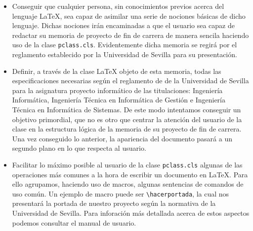 			\begin{itemize}
					\item Conseguir que cualquier persona, sin conocimientos previos acerca del lenguaje \LaTeX{}, sea capaz de
								asimilar una serie de nociones b\'asicas de dicho lenguaje. Dichas nociones ir\'an encaminadas a que 
								el usuario sea capaz de redactar su memoria de proyecto de fin de carrera de manera sencila haciendo uso 
								de la clase \texttt{pclass.cls}. Evidentemente dicha memoria se regir\'a por el reglamento establecido por 
								la Universidad de Sevilla para su presentaci\'on.
					\item Definir, a trav\'es de la clase \LaTeX{} objeto de esta memoria, todas las especificaciones necesarias 
								seg\'un el reglamento de de la Universidad de Sevilla para la asignatura proyecto inform\'atico de 
								las titulaciones: Ingenier\'ia Inform\'atica, Ingenier\'ia T\'ecnica en Inform\'atica de Gesti\'on 
								e Ingenier\'ia T\'ecnica en Inform\'atica de Sistemas. De este modo intentamos conseguir un objetivo 
								primordial, que no es otro que centrar la atenci\'on del usuario de la clase en la estructura l\'ogica 
								de la memoria de su proyecto de fin de carrera. Una vez conseguido lo anterior, la apariencia del 
								documento pasar\'a a un segundo plano en lo que respecta al usuario.  
					\item Facilitar lo m\'aximo posible al usuario de la clase \texttt{pclass.cls} algunas de las operaciones 
					      m\'as comunes a la hora de escribir un documento en \LaTeX{}. Para ello agrupamos, haciendo uso de macros,
					      algunas sentencias de comandos de uso com\'un. Un ejemplo de macro puede ser \verb+\hacerportada+, la cual 
					      nos presentar\'a la portada de nuestro proyecto seg\'un la normativa de la Universidad de Sevilla. Para 
					      inforaci\'on  m\'as detallada acerca de estos aspectos podemos consultar el manual de usuario.  			
			\end{itemize}